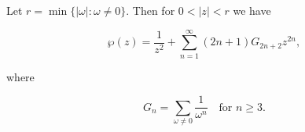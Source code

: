 Let $r = \min\{|\omega| : \omega \neq 0\}$. Then for $0 < |z| < r$ we have

$$\wp(z) = \frac{1}{z^2} + \sum_{n=1}^{\infty} (2n + 1) G_{2n+2} z^{2n},$$

where

$$G_n = \sum_{\omega \neq 0} \frac{1}{\omega^n} \quad \text{for } n \geq 3.$$
